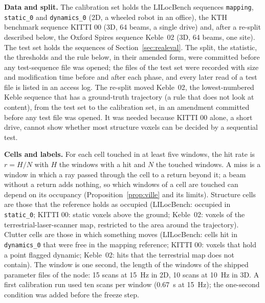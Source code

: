 \noindent\textbf{Data and split.} The calibration set holds the LILocBench \citep{trekel2025lilocbench} sequences \texttt{mapping}, \texttt{static\_0} and \texttt{dynamics\_0} (2D, a wheeled robot in an office), the KTH benchmark \citep{zhang2023dynamic} sequence KITTI 00 (3D, 64 beams, a single drive) and, after a re-split described below, the Oxford Spires \citep{tao2024spires} sequence Keble~02 (3D, 64 beams, one site). The test set holds the sequences of Section~\ref{sec:realeval}. The split, the statistic, the thresholds and the rule below, in their amended form, were committed before any test-sequence file was opened; the files of the test set were recorded with size and modification time before and after each phase, and every later read of a test file is listed in an access log. The re-split moved Keble~02, the lowest-numbered Keble sequence that has a ground-truth trajectory (a rule that does not look at content), from the test set to the calibration set, in an amendment committed before any test file was opened. It was needed because KITTI 00 alone, a short drive, cannot show whether most structure voxels can be decided by a sequential test.

\noindent\textbf{Cells and labels.} For each cell touched in at least five windows, the hit rate is $r=H/N$ with $H$ the windows with a hit and $N$ the touched windows. A miss is a window in which a ray passed through the cell to a return beyond it; a beam without a return adds nothing, so which windows of a cell are touched can depend on its occupancy (Proposition~\ref{prop:ville} and its limits). Structure cells are those that the reference holds as occupied (LILocBench: occupied in \texttt{static\_0}; KITTI 00: static voxels above the ground; Keble~02: voxels of the terrestrial-laser-scanner map, restricted to the area around the trajectory). Clutter cells are those in which something moves (LILocBench: cells hit in \texttt{dynamics\_0} that were free in the mapping reference; KITTI 00: voxels that hold a point flagged dynamic; Keble~02: hits that the terrestrial map does not contain). The window is one second, the length of the windows of the shipped parameter files of the node: 15 scans at 15~Hz in 2D, 10 scans at 10~Hz in 3D. A first calibration run used ten scans per window (0.67~s at 15~Hz); the one-second condition was added before the freeze step.

